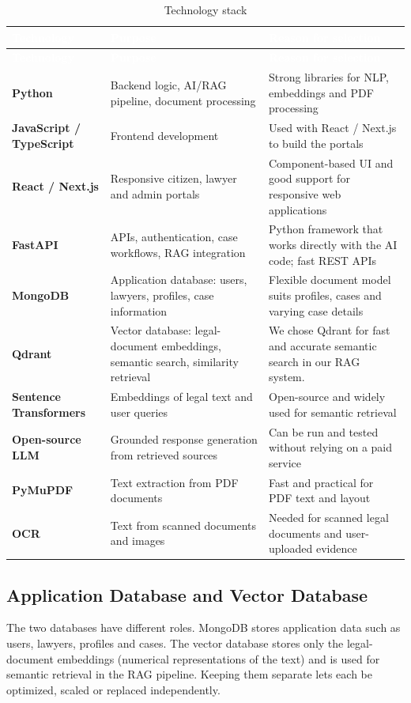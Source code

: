 \documentclass[12pt,a4paper]{report}
\newcommand{\thd}[1]{\textcolor{white}{\textbf{#1}}}
\newcommand{\headrow}{\rowcolor{tablehead}}
\begin{document}
\begin{longtable}{|L{3.6cm}|L{5.0cm}|L{5.4cm}|}
\caption{Technology stack}\label{tab:tech}\\
\hline
\headrow \thd{Technology} & \thd{Purpose} & \thd{Reason for selection} \\ \hline
\endfirsthead
\hline
\headrow \thd{Technology} & \thd{Purpose} & \thd{Reason for selection} \\ \hline
\endhead
\textbf{Python} & Backend logic, AI/RAG pipeline, document processing & Strong libraries for NLP, embeddings and PDF processing \\ \hline
{}\textbf{JavaScript / TypeScript} & Frontend development & Used with React / Next.js to build the portals \\ \hline
\textbf{React / Next.js} & Responsive citizen, lawyer and admin portals & Component-based UI and good support for responsive web applications \\ \hline
{}\textbf{FastAPI} & APIs, authentication, case workflows, RAG integration & Python framework that works directly with the AI code; fast REST APIs \\ \hline
\textbf{MongoDB} & Application database: users, lawyers, profiles, case information & Flexible document model suits profiles, cases and varying case details \\ \hline
{}\textbf{Qdrant} & Vector database: legal-document embeddings, semantic search, similarity retrieval & We chose Qdrant for fast and accurate semantic search in our RAG system. \\ \hline
\textbf{Sentence Transformers} & Embeddings of legal text and user queries & Open-source and widely used for semantic retrieval \\ \hline
{}\textbf{Open-source LLM} & Grounded response generation from retrieved sources & Can be run and tested without relying on a paid service \\ \hline
\textbf{PyMuPDF} & Text extraction from PDF documents & Fast and practical for PDF text and layout \\ \hline
{}\textbf{OCR} & Text from scanned documents and images & Needed for scanned legal documents and user-uploaded evidence \\ \hline
\end{longtable}

\subsection*{Application Database and Vector Database}
The two databases have different roles. MongoDB stores application data such as users, lawyers, profiles and cases. The vector database stores only the legal-document embeddings (numerical representations of the text) and is used for semantic retrieval in the RAG pipeline. Keeping them separate lets each be optimized, scaled or replaced independently.
\end{document}
